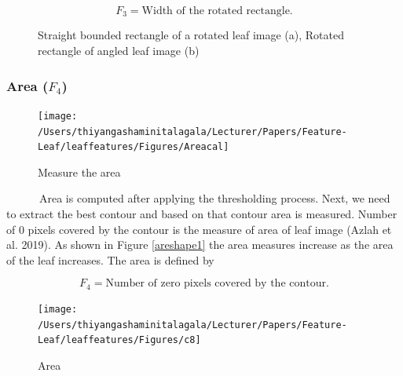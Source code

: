 \documentclass{article}
\begin{document}
\begin{equation}
   F_3 = \text{Width of the rotated rectangle}.
\label{equa_F3}
\end{equation}

\begin{figure}[!ht]

{\centering {}

}

\caption{\label{bound}Straight bounded rectangle of a rotated leaf image (a), Rotated rectangle of angled leaf image (b)}\label{fig:bound}
\end{figure}

\hypertarget{area-f_4}{%
\subsubsection{\texorpdfstring{Area
(\(F_4\))}{Area (F\_4)}}\label{area-f_4}}

\begin{figure}[!ht]

{\centering \texttt{[image: /Users/thiyangashaminitalagala/Lecturer/Papers/Feature-Leaf/leaffeatures/Figures/Areacal]} 

}

\caption{\label{areacal}Measure the area}\label{fig:unnamed-chunk-15}
\end{figure}

~~~~~~Area is computed after applying the thresholding process. Next, we
need to extract the best contour and based on that contour area is
measured. Number of 0 pixels covered by the contour is the measure of
area of leaf image (Azlah et al. 2019). As shown in Figure
\ref{areshape1} the area measures increase as the area of the leaf
increases. The area is defined by

\begin{equation}
   F_4 = \text{Number of zero pixels covered by the contour}.
\label{equa_F4}
\end{equation}

\begin{figure}[!ht]

{\centering \texttt{[image: /Users/thiyangashaminitalagala/Lecturer/Papers/Feature-Leaf/leaffeatures/Figures/c8]} 

}

\caption{\label{areshape1}Area}\label{fig:unnamed-chunk-16}
\end{figure}
\end{document}

